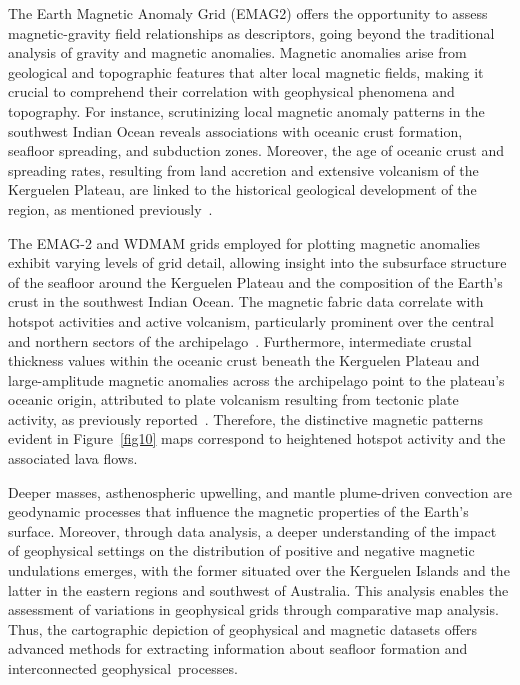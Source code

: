 \documentclass[geomatics,article,accept,pdftex,moreauthors]{Definitions/mdpi}
\begin{document}
The Earth Magnetic Anomaly Grid (EMAG2) offers the opportunity to assess magnetic-gravity field relationships as descriptors, going beyond the traditional analysis of gravity and magnetic anomalies. Magnetic anomalies arise from geological and topographic features that alter local magnetic fields, making it crucial to comprehend their correlation with geophysical phenomena and topography. For instance, scrutinizing local magnetic anomaly patterns in the southwest Indian Ocean reveals associations with oceanic crust formation, seafloor spreading, and subduction zones. Moreover, the age of oceanic crust and spreading rates, resulting from land accretion and extensive volcanism of the Kerguelen Plateau, are linked to the historical geological development of the region, as mentioned previously~\cite{Maus2009}.

The EMAG-2 and WDMAM grids employed for plotting magnetic anomalies exhibit varying levels of grid detail, allowing insight into the subsurface structure of the seafloor around the Kerguelen Plateau and the composition of the Earth's crust in the southwest Indian Ocean. The magnetic fabric data correlate with hotspot activities and active volcanism, particularly prominent over the central and northern sectors of the archipelago~\cite{HENRY2003153,Xu,Pettersen}. Furthermore, intermediate crustal thickness values within the oceanic crust beneath the Kerguelen Plateau and large-amplitude magnetic anomalies across the archipelago point to the plateau's oceanic origin, attributed to plate volcanism resulting from tectonic plate activity, as previously reported~\cite{Direen,Charvis1995}. Therefore, the distinctive magnetic patterns evident in Figure~\ref{fig10} maps correspond to heightened hotspot activity and the associated lava flows. %

Deeper masses, asthenospheric upwelling, and mantle plume-driven convection are geodynamic processes that influence the magnetic properties of the Earth's surface. Moreover, through data analysis, a deeper understanding of the impact of geophysical settings on the distribution of positive and negative magnetic undulations emerges, with the former situated over the Kerguelen Islands and the latter in the eastern regions and southwest of Australia. This analysis enables the assessment of variations in geophysical grids through comparative map analysis. Thus, the cartographic depiction of geophysical and magnetic datasets offers advanced methods for extracting information about seafloor formation and interconnected geophysical~processes. %
\end{document}
